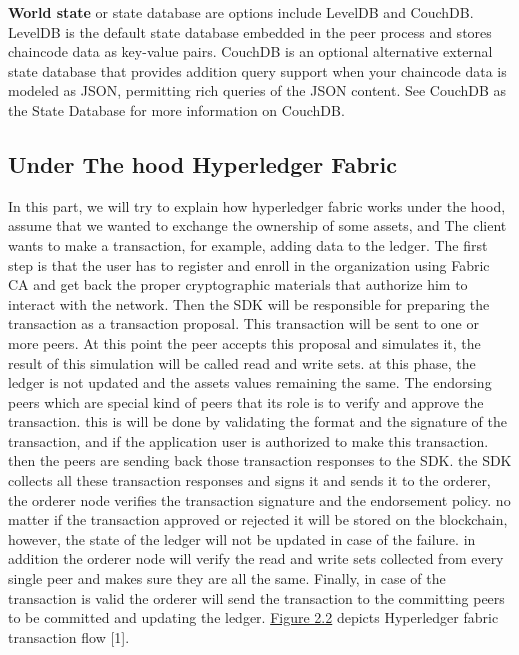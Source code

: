 \textbf{World state} or state database are options include LevelDB and CouchDB. LevelDB is the default state database embedded in the peer process and stores chaincode data as key-value pairs. CouchDB is an optional alternative external state database that provides addition query support when your chaincode data is modeled as JSON, permitting rich queries of the JSON content. See CouchDB as the State Database for more information on CouchDB.


\cleardoublepage

\subsection{Under The hood Hyperledger Fabric }

In this part, we will try to explain how hyperledger fabric works under the hood,
assume that we wanted to exchange the ownership of some assets, and The client wants to make a transaction, for example, adding data to the ledger. 
The first step is that the user has to register and enroll in the organization using Fabric CA and get back the proper cryptographic materials that authorize him to interact with the network. Then the SDK will be responsible for preparing the transaction as a transaction proposal. This transaction will be sent to one or more peers. 
At this point the peer accepts this proposal and simulates it, the result of this simulation will be called read and write sets. at this phase, the ledger is not updated and the assets values remaining the same. 
The endorsing peers which are special kind of peers that its role is to verify and approve the transaction. this is will be done by validating the format and the signature of the transaction, and if the application user is authorized to make this transaction. 
then the peers are sending back those transaction responses to the SDK. the SDK collects all these transaction responses and signs it and sends it to the orderer, the orderer node verifies the transaction signature and the endorsement policy. no matter if the transaction approved or rejected it will be stored on the blockchain, however, the state of the ledger will not be updated in case of the failure. in addition the orderer node will verify the read and write sets collected from every single peer and makes sure they are all the same. 
Finally, in case of the transaction is valid the orderer will send the transaction to the committing peers to be committed and updating the ledger.
\hyperref[fig:transactionflow]{Figure 2.2} depicts Hyperledger fabric transaction flow [1]. 
